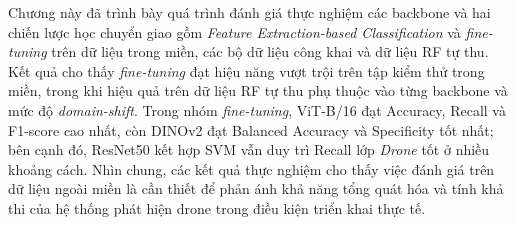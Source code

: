 \documentclass[../DoAn.tex]{subfiles}
\begin{document}
Chương này đã trình bày quá trình đánh giá thực nghiệm các backbone và hai chiến lược học chuyển giao gồm \textit{Feature Extraction-based Classification} và \textit{fine-tuning} trên dữ liệu trong miền, các bộ dữ liệu công khai và dữ liệu RF tự thu. Kết quả cho thấy \textit{fine-tuning} đạt hiệu năng vượt trội trên tập kiểm thử trong miền, trong khi hiệu quả trên dữ liệu RF tự thu phụ thuộc vào từng backbone và mức độ \textit{domain-shift}. Trong nhóm \textit{fine-tuning}, ViT-B/16 đạt Accuracy, Recall và F1-score cao nhất, còn DINOv2 đạt Balanced Accuracy và Specificity tốt nhất; bên cạnh đó, ResNet50 kết hợp SVM vẫn duy trì Recall lớp \textit{Drone} tốt ở nhiều khoảng cách. Nhìn chung, các kết quả thực nghiệm cho thấy việc đánh giá trên dữ liệu ngoài miền là cần thiết để phản ánh khả năng tổng quát hóa và tính khả thi của hệ thống phát hiện drone trong điều kiện triển khai thực tế.
\end{document}
